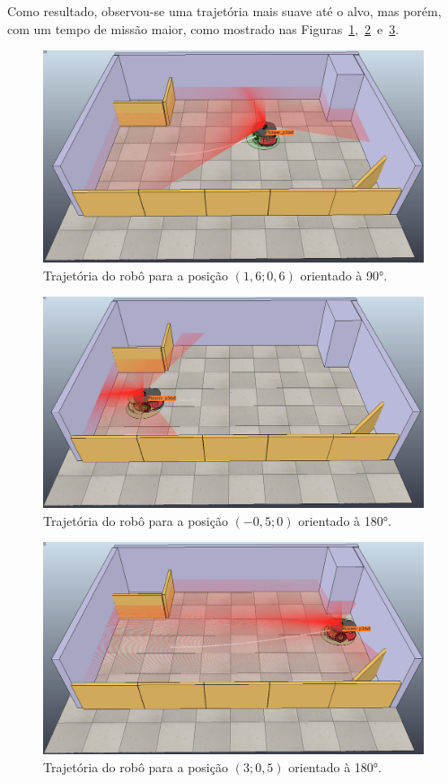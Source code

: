 Como resultado, observou-se uma trajetória mais suave até o alvo, mas porém, com um tempo de missão maior, como mostrado nas Figuras~\ref{fig:5-1},~\ref{fig:5-2}~e~\ref{fig:5-3}.

\begin{figure}[H]
	\centering
	\includegraphics[width=0.6\linewidth]{img/5-1}
	\caption{Trajetória do robô para a posição $(1,6; 0,6)$ orientado à 90°.}
	\label{fig:5-1}
\end{figure}

\begin{figure}[H]
	\centering
	\includegraphics[width=0.6\linewidth]{img/5-2}
	\caption{Trajetória do robô para a posição $(-0,5; 0)$ orientado à 180°.}
	\label{fig:5-2}
\end{figure}

\begin{figure}[H]
	\centering
	\includegraphics[width=0.6\linewidth]{img/5-3}
	\caption{Trajetória do robô para a posição $(3; 0,5)$ orientado à 180°.}
	\label{fig:5-3}
\end{figure}